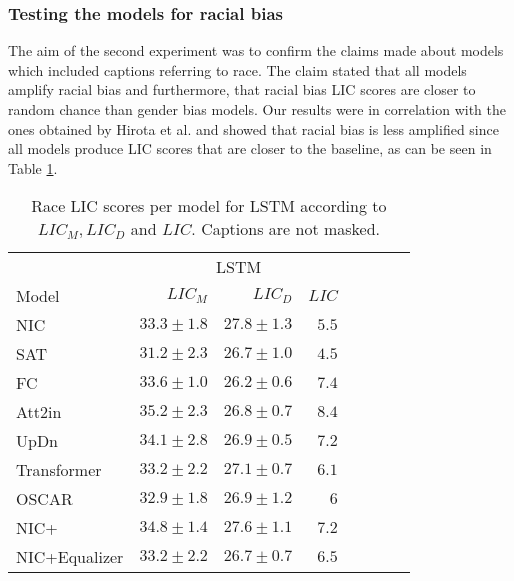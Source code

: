 \subsubsection{Testing the models for racial bias}

The aim of the second experiment was to confirm the claims made about 
models which included captions referring to race. The claim stated 
that all models amplify racial bias and furthermore, that racial bias LIC 
scores are closer to random chance than gender bias models. Our results 
were in correlation with the ones obtained by Hirota et al. and showed that racial bias is less amplified since all 
models produce LIC scores that are closer to the baseline, as can be seen in 
Table \ref{table:racelic}.

\begin{table}[H]
\begin{center}
\setlength{\tabcolsep}{6pt} %
\renewcommand{\arraystretch}{1.25} %
\begin{tabular}{lrrrrrrr}
\toprule
\multicolumn{1}{c}{} & 
\multicolumn{3}{c}{LSTM}


\\\cmidrule(r){2-4}
Model & $LIC_M$ & $LIC_D$ & $LIC$ \\
\hline
NIC \cite{NIC:2015} & $33.3\pm1.8$ & $27.8\pm1.3$ & $5.5$\\
SAT \cite{SAT:2015} & $31.2\pm2.3$ & $26.7\pm1.0$ & \textcolor{numbergreen}{$4.5$}\\
FC \cite{Att2inFC:2016} & $33.6\pm1.0$ & $26.2\pm0.6$ & $7.4$ \\
Att2in \cite{Att2inFC:2016} & $35.2\pm2.3$ & $26.8\pm0.7$ & \textcolor{numberred}{$8.4$} \\
UpDn \cite{UpDn:2017} & $34.1\pm2.8$ & $26.9\pm0.5$ & $7.2$ \\
Transformer \cite{transformer:2017} & $33.2\pm2.2$ & $27.1\pm0.7$ & $6.1$ \\
OSCAR \cite{OSCAR:2020} & $32.9\pm1.8$ & $26.9\pm1.2$ & $6$ \\
NIC+ \cite{NICplusNICEqualizer:2018} & $34.8\pm1.4$ & $27.6\pm1.1$ & $7.2$ \\
NIC+Equalizer \cite{NICplusNICEqualizer:2018} & $33.2\pm2.2$ & $26.7\pm0.7$ & $6.5$ \\

\bottomrule
\end{tabular}
\caption{Race LIC scores per model for LSTM according to $LIC_M, LIC_D$ and $LIC$. Captions are not masked.}
\label{table:racelic}
\end{center}
\end{table}


